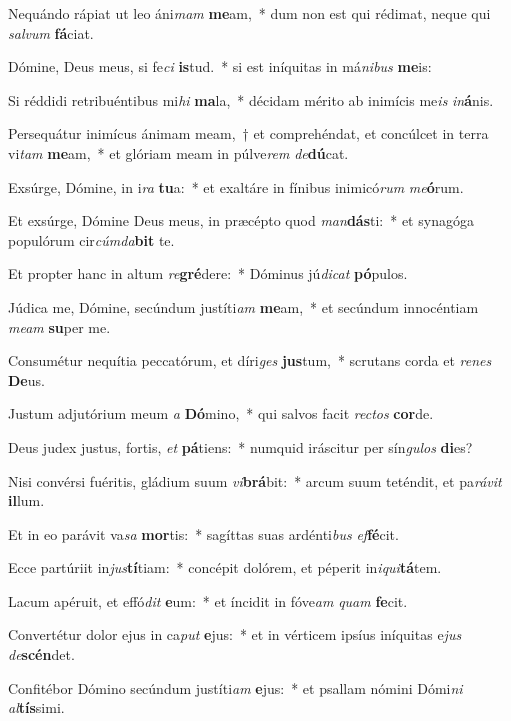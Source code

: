 \item Nequándo rápiat ut leo áni\textit{mam} \textbf{me}am,~* dum non est qui rédimat, neque qui \textit{sal}\textit{vum} \textbf{fá}ciat.
\item Dómine, Deus meus, si fe\textit{ci} \textbf{is}tud.~* si est iníquitas in má\textit{ni}\textit{bus} \textbf{me}is:
\item Si réddidi retribuéntibus mi\textit{hi} \textbf{ma}la,~* décidam mérito ab inimícis me\textit{is} \textit{in}\textbf{á}nis.
\item Persequátur inimícus ánimam meam,~† et comprehéndat, et concúlcet in terra vi\textit{tam} \textbf{me}am,~* et glóriam meam in púlve\textit{rem} \textit{de}\textbf{dú}cat.
\item Exsúrge, Dómine, in i\textit{ra} \textbf{tu}a:~* et exaltáre in fínibus inimicó\textit{rum} \textit{me}\textbf{ó}rum.
\item Et exsúrge, Dómine Deus meus, in præcépto quod \textit{man}\textbf{dás}ti:~* et synagóga populórum cir\textit{cúm}\textit{da}\textbf{bit} te.
\item Et propter hanc in altum \textit{re}\textbf{gré}dere:~* Dóminus jú\textit{di}\textit{cat} \textbf{pó}pulos.
\item Júdica me, Dómine, secúndum justíti\textit{am} \textbf{me}am,~* et secúndum innocéntiam \textit{me}\textit{am} \textbf{su}per me.
\item Consumétur nequítia peccatórum, et díri\textit{ges} \textbf{jus}tum,~* scrutans corda et \textit{re}\textit{nes} \textbf{De}us.
\item Justum adjutórium meum \textit{a} \textbf{Dó}mino,~* qui salvos facit \textit{rec}\textit{tos} \textbf{cor}de.
\item Deus judex justus, fortis, \textit{et} \textbf{pá}tiens:~* numquid iráscitur per sín\textit{gu}\textit{los} \textbf{di}es?
\item Nisi convérsi fuéritis, gládium suum \textit{vi}\textbf{brá}bit:~* arcum suum teténdit, et pa\textit{rá}\textit{vit} \textbf{il}lum.
\item Et in eo parávit va\textit{sa} \textbf{mor}tis:~* sagíttas suas ardénti\textit{bus} \textit{ef}\textbf{fé}cit.
\item Ecce partúriit in\textit{jus}\textbf{tí}tiam:~* concépit dolórem, et péperit in\textit{i}\textit{qui}\textbf{tá}tem.
\item Lacum apéruit, et effó\textit{dit} \textbf{e}um:~* et íncidit in fóve\textit{am} \textit{quam} \textbf{fe}cit.
\item Convertétur dolor ejus in ca\textit{put} \textbf{e}jus:~* et in vérticem ipsíus iníquitas e\textit{jus} \textit{de}\textbf{scén}det.
\item Confitébor Dómino secúndum justíti\textit{am} \textbf{e}jus:~* et psallam nómini Dómi\textit{ni} \textit{al}\textbf{tís}simi.
